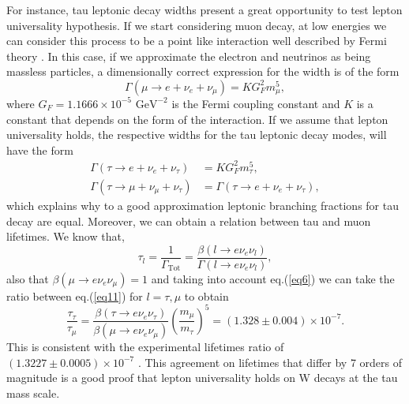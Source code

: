 For instance, tau leptonic decay widths present a great opportunity to test lepton universality hypothesis. If we start considering muon decay, at low energies we can consider this process to be a point like interaction well described by Fermi theory \cite{FermiTheory}. In this case, if we approximate the electron and neutrinos as being massless particles, a dimensionally correct expression for the width is of the form
\begin{equation}
	\Gamma(\mu\to e+\nu_e +\nu_\mu)=KG_{F}^{2}m_{\mu}^{5},
\end{equation} 
where $G_F=1.1666\times 10^{-5} \text{ GeV}^{-2}$ is the Fermi coupling constant and $K$ is a constant that depends on the form of the interaction. If we assume that lepton universality holds, the respective widths for the tau leptonic decay modes, will have the form
\begin{align}
\Gamma(\tau\to e+\nu_e +\nu_\tau)&=KG_{F}^{2}m_{\tau}^{5},
\\
\Gamma(\tau\to \mu+\nu_\mu +\nu_\tau)&=\Gamma(\tau\to e+\nu_e +\nu_\tau),
\end{align}  
which explains why to a good approximation leptonic branching fractions for tau decay are equal. Moreover, we can obtain a relation between tau and muon lifetimes. We know that,
\begin{equation}
	\tau_l=\frac{1}{\Gamma_\text{Tot}}=\frac{\beta(l\to e\nu_e \nu_l)}{\Gamma(l\to e\nu_e \nu_l)},
	\label{eq11}
\end{equation}
also that $\beta(\mu\to e\nu_e \nu_\mu)=1$ and taking into account eq.(\ref{eq6}) we can take the ratio between eq.(\ref{eq11}) for $l=\tau ,\mu$ to obtain
\begin{equation}
\frac{\tau_\tau}{\tau_\mu}=\frac{\beta(\tau\to e\nu_e \nu_\tau)}{\beta(\mu\to e\nu_e \nu_\mu)}\left(\frac{m_\mu}{m_\tau}\right)^5=(1.328\pm 0.004)\times 10^{-7}.
\end{equation}
This is consistent with the experimental lifetimes ratio of $(1.3227\pm 0.0005)\times10^{-7}$ \cite{Martin:1992rg}. This agreement on lifetimes that differ by 7 orders of magnitude is a good proof that lepton universality holds on W decays at the tau mass scale.

